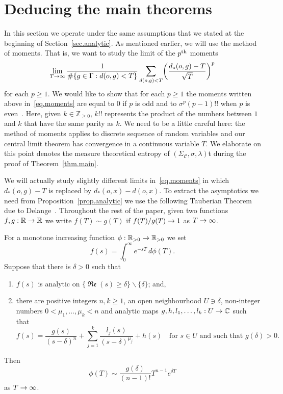 \documentclass[10pt]{amsart}
\theoremstyle{definition}\newtheorem{defi}[theo]{Definition}\newtheorem{rema}[theo]{Remark}\newtheorem{exam}[theo]{Example}\newtheorem{exem}[theo]{Example}\newtheorem{nota}[theo]{Notation}
\newcommand{\G}{\Gamma}
\newcommand{\Cc}{\mathcal{C}}
\newcommand{\C}{\mathbb{C}}
\newcommand{\R}{\mathbb{R}}
\newcommand{\Z}{\mathbb{Z}}
\DeclareMathOperator{\fkRe}{\mathfrak{Re}}
\let\originalleft\left
\let\originalright\right
\renewcommand{\left}{\mathopen{}\mathclose\bgroup\originalleft}
\renewcommand{\right}{\aftergroup\egroup\originalright}
\renewcommand*{\to}{\mathchoice{\longrightarrow}{\rightarrow}{\rightarrow}{\rightarrow}}
\theoremstyle{plain}
\begin{document}
\section{Deducing the main theorems}\label{sec.proofs}


In this section we operate under the same assumptions that we stated at the beginning of Section~\ref{sec.analytic}. As mentioned earlier, we will use the method of moments. That is, we want to study the limit of the $p^{\rm th}$ moments
\begin{equation}\label{eq.moments}
\lim_{T\to\infty} \frac{1}{\#\{ g\in\G: d(o,g) < T\}} \sum_{d(o,g) < T} \left(\frac{d_\ast(o,g) - T}{\sqrt{T}} \right)^p
\end{equation}
for each $p\ge 1$. We would like to show that for each $p\ge 1$ the moments written above in~\eqref{eq.moments} are equal to $0$ if $p$ is odd and to $\sigma^p (p-1)!!$ when $p$ is even~\cite[Theorem~30.2]{billingsley}. Here, given $k \in \Z_{\ge 0}$, $k!!$ represents the product of the numbers\pagebreak{} between $1$ and $k$ that have the same parity as $k$. We need to be a little careful here: the method of moments applies to discrete sequence of random variables and our central limit theorem has convergence in a continuous variable $T$. We elaborate on this point denotes the measure theoretical entropy of $(\Sigma_\Cc, \sigma, \lambda)$t during the proof of Theorem~\ref{thm.main}.



We will actually study slightly different limits in~\eqref{eq.moments} in which $d_\ast(o,g) - T$ is replaced by $d_\ast(o,x) - d(o,x)$. To extract the asymptotics we need from Proposition~\ref{prop.analytic} we use the following {Tauberian Theorem} due to Delange~\cite[Theorem~III]{Delange}. Throughout the rest of the paper, given two functions $f,g : \R \to \R$ we write $f(T) \sim g(T)$ if $f(T)/g(T) \to 1$ as $T\to\infty$.

\begin{prop}\label{prop.tau}
For a monotone increasing function $\phi : \R_{>0} \to \R_{>0}$ we set
\[
f(s) = \int_0^{\infty} e^{-sT} \ d\phi(T).
\]
Suppose that there is $\delta > 0$ such that
\begin{enumerate}
\item\label{prop3.1.1} $f(s)$ is analytic on $\{\fkRe(s) \ge \delta\} \backslash \{\delta\}$; and,
\item\label{prop3.1.2} there are positive integers $n, k \ge 1$, an open neighbourhood $U \ni \delta$, non-integer numbers $0 < \mu_1, \dots, \mu_k < n$ and analytic maps $g,h, l_1, \dots, l_k : U \to \C$ such that
\[
f(s) = \frac{g(s)}{(s-\delta)^n} + \sum_{j=1}^k \frac{l_j(s)}{(s-\delta)^{\mu_j}}+ h(s) \quad \text{for $s \in U$ and such that $g(\delta) > 0$}.
\]
\end{enumerate}
Then
\[
\phi(T) \sim \frac{g(\delta)}{(n-1)!} T^{n-1} e^{\delta T}
\]
as $T\to\infty$.
\end{prop}
\end{document}
